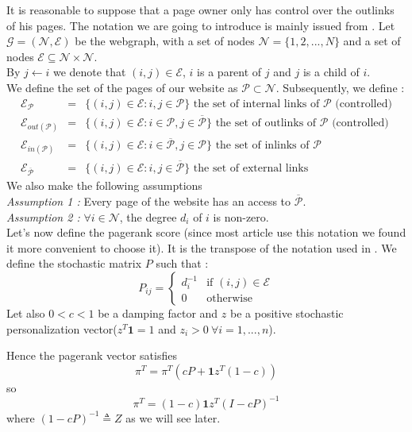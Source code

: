 \documentclass{article}
\newcommand{\1}{\mathbf{1}}
\theoremstyle{definition}
\begin{document}
It is reasonable to suppose that a page owner only has control over the outlinks of his pages. The notation we are going to introduce is mainly issued from \cite{de2008maximizing}.
Let $\mathcal{G} = (\mathcal{N},\mathcal{E})$ be the webgraph, with a set of nodes  $\mathcal{N} = \{1,2,...,N\}$ and a set of nodes $\mathcal{E}\subseteq \mathcal{N}\times \mathcal{N}$. \\
By $j \leftarrow i$ we denote that $(i,j)\in \mathcal{E}$, $i$ is a parent of $j$ and $j$ is a child of $i$. 
\\
We define the set of the pages of our website as  $\mathcal{P} \subset \mathcal{N}$. Subsequently, we define :
\begin{eqnarray*}
\mathcal{E}_{\mathcal{P}} & = & \{(i,j)\in \mathcal{E} : i,j \in \mathcal{P}\} \text{ the set of internal links of }\mathcal{P} \text{ (controlled)} \\
\mathcal{E}_{out(\mathcal{P})} & = & \{(i,j)\in \mathcal{E} : i \in \mathcal{P},j \in \overline{\mathcal{P}}\} \text{ the set of outlinks of }\mathcal{P} \text{ (controlled)}\\
\mathcal{E}_{in(\mathcal{P})} & = & \{(i,j)\in \mathcal{E} : i \in \overline{\mathcal{P}},j \in \mathcal{P}\} \text{ the set of inlinks of }\mathcal{P} \\
\mathcal{E}_{\overline{\mathcal{P}}} & = & \{(i,j)\in \mathcal{E} : i,j \in \overline{\mathcal{P}}\} \text{ the set of external links} 
\end{eqnarray*}
We also make the following assumptions\\
\textit{Assumption 1 :} Every page of the website has an access to $\overline{\mathcal{P}}$.\\
\textit{Assumption 2 :} $\forall i\in \mathcal{N}$, the degree $d_i$ of $i$ is non-zero.\\
Let's now define the pagerank score (since most article use this notation we found it more convenient to choose it). It is the transpose of the notation used in \cite{leskovec}.
We define the stochastic matrix $P$ such that :
$$ P_{ij} = \left\lbrace \begin{array}{ll}
d_i^{-1} & \text{if }(i,j)\in \mathcal{E} \\
0 & \text{otherwise}
\end{array}
\right.$$
Let also $0<c<1$ be a damping factor and $z$ be a positive stochastic personalization vector($z^T \mathbf{1} = 1$ and $z_i>0 \:\forall i = 1,...,n$).

Hence the pagerank vector satisfies
\[ \pi^T = \pi^T (cP + \1 z^T(1-c)) \]
so
\[ \pi^T = (1-c)\1 z^T(I - cP)^{-1} \]
where $(1 - cP)^{-1} \triangleq Z$ as we will see later.
\end{document}
